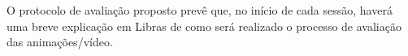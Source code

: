 \documentclass[a4paper,11pt,titlepage,singlespacing]{article}
\begin{document}













O protocolo de avaliação proposto prevê que, no início de cada sessão, haverá uma breve explicação em Libras de como será realizado o processo de avaliação das animações/vídeo.%






\end{document}
